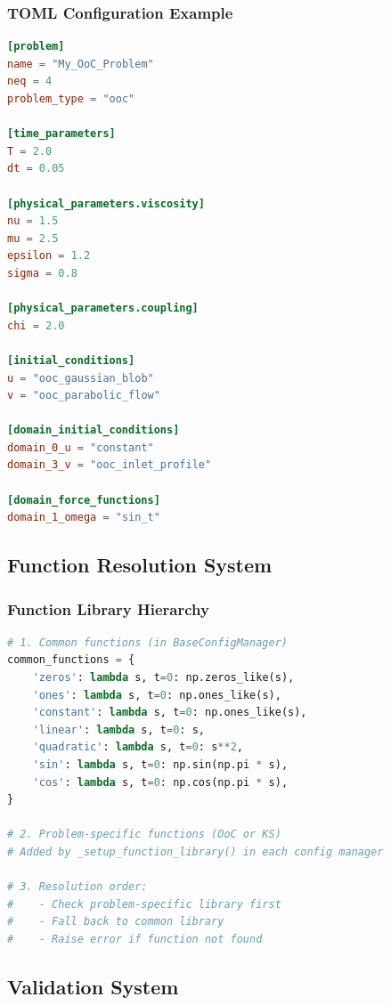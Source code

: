 \subsubsection{TOML Configuration Example}

\begin{lstlisting}[language=toml, caption=OoC TOML Configuration]
[problem]
name = "My_OoC_Problem"
neq = 4
problem_type = "ooc"

[time_parameters]
T = 2.0
dt = 0.05

[physical_parameters.viscosity]
nu = 1.5
mu = 2.5
epsilon = 1.2
sigma = 0.8

[physical_parameters.coupling]
chi = 2.0

[initial_conditions]
u = "ooc_gaussian_blob"
v = "ooc_parabolic_flow"

[domain_initial_conditions]
domain_0_u = "constant"
domain_3_v = "ooc_inlet_profile"

[domain_force_functions]
domain_1_omega = "sin_t"
\end{lstlisting}

\subsection{Function Resolution System}
\label{subsec:function_resolution}

\subsubsection{Function Library Hierarchy}

\begin{lstlisting}[language=Python, caption=Function Resolution Process]
# 1. Common functions (in BaseConfigManager)
common_functions = {
    'zeros': lambda s, t=0: np.zeros_like(s),
    'ones': lambda s, t=0: np.ones_like(s),
    'constant': lambda s, t=0: np.ones_like(s),
    'linear': lambda s, t=0: s,
    'quadratic': lambda s, t=0: s**2,
    'sin': lambda s, t=0: np.sin(np.pi * s),
    'cos': lambda s, t=0: np.cos(np.pi * s),
}

# 2. Problem-specific functions (OoC or KS)
# Added by _setup_function_library() in each config manager

# 3. Resolution order:
#    - Check problem-specific library first
#    - Fall back to common library
#    - Raise error if function not found
\end{lstlisting}

\subsection{Validation System}
\label{subsec:validation_system}

